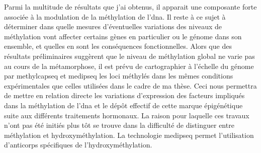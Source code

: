 \documentclass[../main.tex]{subfiles}
\begin{document}
	

	Parmi la multitude de résultats que j'ai obtenus, il apparait une composante forte associée à la modulation de la méthylation de l'\gls{dna}.
	Il reste à ce sujet à déterminer dans quelle mesures d'éventuelles variations des niveaux de méthylation vont affecter certains gènes en particulier ou le génome dans son ensemble, et quelles en sont les conséquences fonctionnelles.
	Alors que des résultats préliminaires suggèrent que le niveau de méthylation global ne varie pas au cours de la métamorphose, il est prévu de cartographier à l'échelle du génome par \gls{methylcapseq} et \gls{medipseq} les loci méthylés dans les mêmes conditions expérimentales que celles utilisées dans le cadre de ma thèse.
	Ceci nous permettra de mettre en relation directe les variations d'expression des facteurs impliqués dans la méthylation de l'\gls{dna} et le dépôt effectif de cette marque épigénétique suite aux différents traitements hormonaux.
	La raison pour laquelle ces travaux n'ont pas été initiés plus tôt se trouve dans la difficulté de distinguer entre méthylation et hydroxyméthylation.
	La technologie \gls{medipseq} permet l'utilisation d'anticorps spécifiques de l'hydroxyméthylation.
\end{document}
